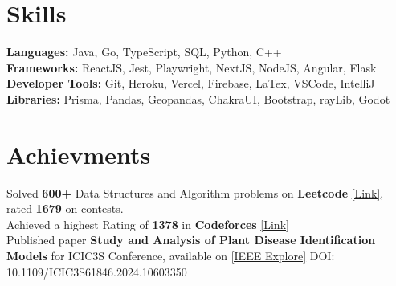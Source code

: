 \documentclass[]{Nikhil_Kadiyan_Resume}
\begin{document}

\section{Skills} 
\hrulefill

\pt \textbf{Languages:} Java, Go, TypeScript, SQL, Python, C++  \\
\pt \textbf{Frameworks:} ReactJS, Jest, Playwright, NextJS, NodeJS, Angular, Flask\\
\pt \textbf{Developer Tools:}  Git, Heroku, Vercel, Firebase, LaTex, VSCode, IntelliJ\\
\pt \textbf{Libraries:} Prisma, Pandas, Geopandas, ChakraUI, Bootstrap, rayLib, Godot\\

\sectionsep

\section{Achievments} 
\hrulefill

\pt Solved \textbf{600+} Data Structures and Algorithm problems on \textbf{Leetcode} \href{https://leetcode.com/anidnottaken/}{[Link]}, rated \textbf{1679} on contests.\\ 
\pt Achieved a highest Rating of \textbf{1378} in \textbf{Codeforces} \href{https://codeforces.com/profile/nikhilcad}{[Link]} \\
\pt Published paper \textbf{Study and Analysis of Plant Disease Identification Models} for ICIC3S Conference, available on \href{https://ieeexplore.ieee.org/document/10603350}{[IEEE Explore]} DOI: 10.1109/ICIC3S61846.2024.10603350\\
\end{document}
